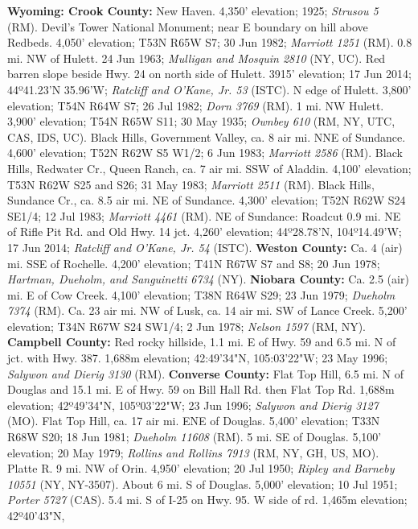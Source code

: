   \textbf{Wyoming: Crook County:}
New Haven. 4,350’ elevation; 1925; \textit{Strusou 5} (RM).
Devil's Tower National Monument; near E boundary on hill above Redbeds.
4,050' elevation; T53N R65W S7; 30 Jun 1982; \textit{Marriott 1251} (RM).
0.8 mi. NW of Hulett. 24 Jun 1963; \textit{Mulligan and Mosquin 2810} (NY, UC).
Red barren slope beside Hwy. 24 on north side of Hulett. 3915' elevation;
17 Jun 2014; 44º41.23'N 35.96'W; \textit{Ratcliff and O'Kane, Jr. 53} (ISTC).
N edge of Hulett. 3,800' elevation; T54N R64W S7; 26 Jul 1982;
\textit{Dorn 3769} (RM).
1 mi. NW Hulett. 3,900' elevation; T54N R65W S11; 30 May 1935;
\textit{Ownbey 610} (RM, NY, UTC, CAS, IDS, UC).
Black Hills, Government Valley, ca. 8 air mi. NNE of Sundance. 4,600' elevation;
T52N R62W S5 W1/2; 6 Jun 1983; \textit{Marriott 2586} (RM).
Black Hills, Redwater Cr., Queen Ranch, ca. 7 air mi. SSW of Aladdin. 4,100'
elevation; T53N R62W S25 and S26; 31 May 1983; \textit{Marriott 2511} (RM).
Black Hills, Sundance Cr., ca. 8.5 air mi. NE of Sundance. 4,300' elevation;
T52N R62W S24 SE1/4; 12 Jul 1983; \textit{Marriott 4461} (RM).
NE of Sundance: Roadcut 0.9 mi. NE of Rifle Pit Rd. and Old Hwy. 14 jct.
4,260' elevation; 44º28.78'N, 104º14.49'W;
17 Jun 2014; \textit{Ratcliff and O'Kane, Jr. 54} (ISTC).
  \textbf{Weston County:}
Ca. 4 (air) mi. SSE of Rochelle. 4,200' elevation; T41N R67W S7 and S8;
20 Jun 1978; \textit{Hartman, Dueholm, and Sanguinetti 6734} (NY).
  \textbf{Niobara County:}
Ca. 2.5 (air) mi. E of Cow Creek. 4,100' elevation; T38N R64W S29; 23 Jun 1979;
\textit{Dueholm 7374} (RM).
Ca. 23 air mi. NW of Lusk, ca. 14 air mi. SW of Lance Creek. 5,200' elevation;
T34N R67W S24 SW1/4; 2 Jun 1978; \textit{Nelson 1597} (RM, NY).
  \textbf{Campbell County:}
Red rocky hillside, 1.1 mi. E of Hwy. 59 and 6.5 mi. N of jct. with Hwy. 387.
1,688m elevation; 42:49'34"N, 105:03'22"W; 23 May 1996;
\textit{Salywon and Dierig 3130} (RM).
  \textbf{Converse County:}
Flat Top Hill, 6.5 mi. N of Douglas and 15.1 mi. E of Hwy. 59 on Bill Hall Rd.
then Flat Top Rd. 1,688m elevation; 42º49'34"N, 105º03'22"W;
23 Jun 1996; \textit{Salywon and Dierig 3127} (MO).
Flat Top Hill, ca. 17 air mi. ENE of Douglas. 5,400' elevation; T33N R68W S20;
18 Jun 1981; \textit{Dueholm 11608} (RM).
5 mi. SE of Douglas. 5,100' elevation; 20 May 1979;
\textit{Rollins and Rollins 7913} (RM, NY, GH, US, MO).
Platte R. 9 mi. NW of Orin. 4,950' elevation; 20 Jul 1950;
\textit{Ripley and Barneby 10551} (NY, NY-3507).
About 6 mi. S of Douglas. 5,000' elevation; 10 Jul 1951;
\textit{Porter 5727} (CAS).
5.4 mi. S of I-25 on Hwy. 95. W side of rd. 1,465m elevation; 42º40'43"N, 
